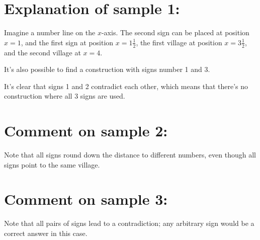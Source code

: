 \section*{Explanation of sample 1:}
Imagine a number line on the $x$-axis.
The second sign can be placed at position $x = 1$, 
and the first sign at position $x = 1\frac{1}{2}$, 
the first village at position $x = 3\frac{1}{2}$, 
and the second village at $x = 4$.

It's also possible to find a construction with signs number 1 and 3.

It's clear that signs 1 and 2 contradict each other, which means that there's no construction where all 3 signs are used.

\section*{Comment on sample 2:}
Note that all signs round down the distance to different numbers, even though all signs point to the same village.

\section*{Comment on sample 3:}
Note that all pairs of signs lead to a contradiction; any arbitrary sign would be a correct answer in this case.